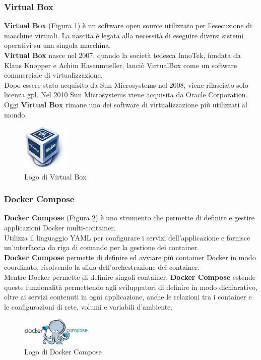\subsubsection{Virtual Box}
\textbf{Virtual Box} (Figura \ref{fig:virtual_box}) è un software \gls{open source}{} utilizzato per l'esecuzione di macchine 
virtuali. La nascita è legata alla necessità di eseguire diversi sistemi operativi su una singola macchina.\\
\textbf{Virtual Box} nasce nel 2007, quando la società tedesca InnoTek, fondata da Klaus Knopper e Achim Hasenmueller, lanciò VirtualBox come un software commerciale di virtualizzazione.\\    
Dopo essere stato acquisito da Sun Microsystems nel 2008, viene rilasciato solo licenza \gls{gpl}{}.
Nel 2010 Sun Microsystems viene acquisita da Oracle Corporation.\\
Oggi \textbf{Virtual Box} rimane uno dei software di virtualizzazione più utilizzati al mondo.
\begin{figure}[h]
    \centering
    \includegraphics[width=0.2\textwidth]{images/tecnologie/logo_virtualbox.png}
    \caption{Logo di Virtual Box}
    \label{fig:virtual_box}
\end{figure}
\subsubsection{Docker Compose}
\textbf{Docker Compose} (Figura \ref{fig:docker_compose}) è uno strumento che permette di definire e gestire applicazioni \gls{Docker}{} multi-container. \\
Utilizza il linguaggio YAML per configurare i servizi dell'applicazione e fornisce un'interfaccia da riga di comando per la gestione dei \gls{container}{}.\\
\textbf{Docker Compose} permette di definire ed avviare più \gls{container}{} \gls{Docker}{} in modo coordinato, risolvendo 
la sfida dell'orchestrazione dei \gls{container}{}.\\
Mentre \gls{Docker}{} permette di definire singoli \gls{container}{}, \textbf{Docker Compose} estende queste funzionalità permettendo agli sviluppatori 
di definire in modo dichiarativo, oltre ai servizi contenuti in ogni applicazione, anche le relazioni tra i \gls{container}{} e le configurazioni di rete, volumi e variabili d'ambiente.\\
\begin{figure}[h]
    \centering
    \includegraphics[width=0.3\textwidth]{images/tecnologie/logo_docker_compose.png}
    \caption{Logo di Docker Compose}
    \label{fig:docker_compose}
\end{figure}

